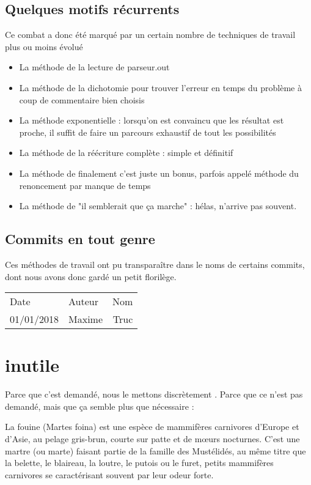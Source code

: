 \documentclass{article}
\begin{document}
	\subsection{Quelques motifs récurrents}
	
		Ce combat a donc été marqué par un certain nombre de techniques de travail plus ou moins évolué
		
		\begin{itemize}
			\item La méthode de la lecture de parseur.out
			\item La méthode de la dichotomie pour trouver l'erreur en temps  du problème à coup de commentaire bien choisis
			\item La méthode exponentielle : lorsqu'on est convaincu que les résultat est proche, il suffit de faire un parcours exhaustif de tout les possibilités
			\item La méthode de la réécriture complète : simple et définitif
			\item La méthode de finalement c'est juste un bonus, parfois appelé méthode du renoncement par manque de temps
			\item La méthode de "il semblerait que ça marche" : hélas, n'arrive pas souvent.
		\end{itemize}
	
	\subsection{Commits en tout genre}
	
		Ces méthodes de travail ont pu transparaître dans le noms de certains commits, dont nous avons donc gardé un petit florilège.
		
		\begin{tabular}{l|l|r}
			Date & Auteur & Nom\\
			01/01/2018 & Maxime & Truc\\
		\end{tabular}


	\section{inutile}
	Parce que c'est demandé, nous le mettons discrètement \cite{Landin:1966:NPL:365230.365257}. Parce que ce n'est pas demandé, mais que ça semble plus que nécessaire : 
	
	La fouine (Martes foina) est une espèce de mammifères carnivores d'Europe et d'Asie, au pelage gris-brun, courte sur patte et de mœurs nocturnes. C'est une martre (ou marte) faisant partie de la famille des Mustélidés, au même titre que la belette, le blaireau, la loutre, le putois ou le furet, petits mammifères carnivores se caractérisant souvent par leur odeur forte.\cite{wiki:Fouine}
\end{document}
